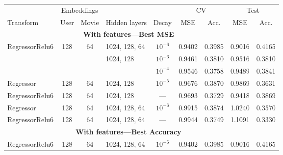 \begin{table}
\centering
\small
\begin{tabular}{lcclccccc}
\toprule
           & \multicolumn{2}{c}{Embeddings} &  &   &  \multicolumn{2}{c}{CV} & \multicolumn{2}{c}{Test} \\
           \cmidrule(lr){2-3}\cmidrule(lr){6-7}\cmidrule(l){8-9}
Transform & User & Movie & Hidden layers &  Decay & MSE & Acc. & MSE & Acc.  \\
\midrule
\multicolumn{8}{c}{\textbf{With features---Best MSE}}\\\addlinespace
RegressorRelu6 & 128 & 64 & 1024, 128, 64 & $10^{-6}$   &  0.9402 &      0.3985 &   0.9016 &        0.4165 \\
           &     &    & 1024, 128 & $10^{-6}$   &  0.9461 &      0.3810 &   0.9516 &        0.3810 \\
           &     &    &                                 & $10^{-4}$   &  0.9546 &      0.3758 &   0.9489 &        0.3841 \\
Regressor & 128 & 64 & 1024, 128 & $10^{-5}$   &  0.9676 &      0.3870 &   0.9869 &        0.3631 \\
RegressorRelu6 & 128 & 64 & 1024, 128 & ---   &  0.9693 &      0.3729 &   0.9418 &        0.3869 \\
Regressor & 128 & 64 & 1024, 128, 64 & $10^{-6}$   &  0.9915 &      0.3874 &   1.0240 &        0.3570 \\
RegressorRelu6 & 128 & 64 & 1024, 128, 64 & ---   &  0.9944 &      0.3749 &   1.1091 &        0.3330 \\
\midrule
\multicolumn{8}{c}{\textbf{With features---Best Accuracy}}\\\addlinespace
RegressorRelu6 & 128 & 64 & 1024, 128, 64 & $10^{-6}$   &  0.9402 &      0.3985 &   0.9016 &        0.4165 \\

\end{tabular}
\end{table}
